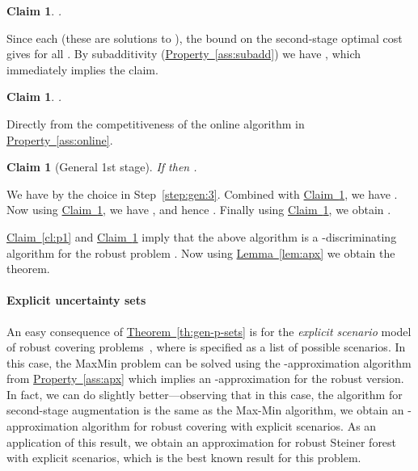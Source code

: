 \documentclass[11pt,letterpaper]{article}
\newcommand{\lref}[2][]{\hyperref[#2]{#1~\ref*{#2}}}
\newtheorem{claim}[theorem]{Claim}
\newenvironment{Myquote}{\par\begingroup
\addtolength{\leftskip}{1em} \rightskip\leftskip }{\par
\endgroup
}
\newenvironment{proof}{

\noindent{\bf Proof:}} {\hfill


}
\def\mm{{\sf MaxMin}\xspace}
\begin{document}
\begin{proof}
\begin{Myquote}
\begin{claim}\label{cl:p2}
.
\end{claim}
\begin{proof}
Since each  (these are solutions to ), the bound on the second-stage optimal cost gives
 for all . By subadditivity (\lref[Property]{ass:subadd}) we have
, which immediately implies the claim.
\end{proof}

\begin{claim}\label{cl:p3}
.
\end{claim}
\begin{proof}
Directly from the competitiveness of the online algorithm in \lref[Property]{ass:online}.
\end{proof}

\begin{claim}[General 1st stage]\label{cl:p4}
If  then .
\end{claim}
\begin{proof}
We have 
by the choice in Step~\eqref{step:gen:3}. Combined with \lref[Claim]{cl:p3}, we have . Now using \lref[Claim]{cl:p2}, we have , and hence . Finally using \lref[Claim]{cl:p3}, we obtain .
\end{proof}
\end{Myquote}

\lref[Claim]{cl:p1} and \lref[Claim]{cl:p4} imply that the above algorithm is a
-discriminating algorithm for the robust problem . Now using \lref[Lemma]{lem:apx} we obtain the theorem.
\end{proof}


\paragraph{Explicit uncertainty sets} An easy consequence of \lref[Theorem]{th:gen-p-sets} is for the {\em  explicit scenario} model of robust covering
problems~\cite{DGRS05,GGR06}, where  is specified as a list of possible scenarios. In this case, the \mm
problem can be solved using the -approximation algorithm from \lref[Property]{ass:apx} which implies an
-approximation for the robust version. In fact, we can do slightly better---observing that in
this  case, the algorithm for second-stage augmentation is the same as the Max-Min algorithm, we obtain an
-approximation algorithm for robust covering with explicit scenarios. As an application of
this result, we obtain an  approximation for robust Steiner forest with explicit scenarios, which is the
best known result for this problem.
\end{document}
